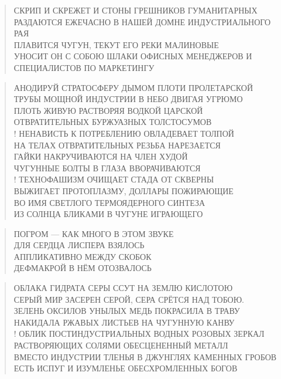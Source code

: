 \poemtitle{***}
\begin{verse}
СКРИП И СКРЕЖЕТ И СТОНЫ ГРЕШНИКОВ ГУМАНИТАРНЫХ\\
РАЗДАЮТСЯ ЕЖЕЧАСНО В НАШЕЙ ДОМНЕ ИНДУСТРИАЛЬНОГО РАЯ\\
ПЛАВИТСЯ ЧУГУН, ТЕКУТ ЕГО РЕКИ МАЛИНОВЫЕ\\
УНОСИТ ОН С СОБОЮ ШЛАКИ ОФИСНЫХ МЕНЕДЖЕРОВ И СПЕЦИАЛИСТОВ ПО МАРКЕТИНГУ
\end{verse}

\poemtitle{***}
\begin{verse}
АНОДИРУЙ СТРАТОСФЕРУ ДЫМОМ ПЛОТИ ПРОЛЕТАРСКОЙ\\
ТРУБЫ МОЩНОЙ ИНДУСТРИИ В НЕБО ДВИГАЯ УГРЮМО\\
ПЛОТЬ ЖИВУЮ РАСТВОРЯЯ ВОДКОЙ ЦАРСКОЙ\\
ОТВРАТИТЕЛЬНЫХ БУРЖУАЗНЫХ ТОЛСТОСУМОВ\\!
НЕНАВИСТЬ К ПОТРЕБЛЕНИЮ ОВЛАДЕВАЕТ ТОЛПОЙ\\
НА ТЕЛАХ ОТВРАТИТЕЛЬНЫХ РЕЗЬБА НАРЕЗАЕТСЯ\\
ГАЙКИ НАКРУЧИВАЮТСЯ НА ЧЛЕН ХУДОЙ\\
ЧУГУННЫЕ БОЛТЫ В ГЛАЗА ВВОРАЧИВАЮТСЯ\\!
ТЕХНОФАШИЗМ ОЧИЩАЕТ СТАДА ОТ СКВЕРНЫ\\
ВЫЖИГАЕТ ПРОТОПЛАЗМУ, ДОЛЛАРЫ ПОЖИРАЮЩИЕ\\
ВО ИМЯ СВЕТЛОГО ТЕРМОЯДЕРНОГО СИНТЕЗА\\
ИЗ СОЛНЦА БЛИКАМИ В ЧУГУНЕ ИГРАЮЩЕГО
\end{verse}

\poemtitle{***}
\begin{verse}
ПОГРОМ --- КАК МНОГО В ЭТОМ ЗВУКЕ\\
ДЛЯ СЕРДЦА ЛИСПЕРА ВЗЯЛОСЬ\\
АППЛИКАТИВНО МЕЖДУ СКОБОК\\
ДЕФМАКРОЙ В НЁМ ОТОЗВАЛОСЬ
\end{verse}

\poemtitle{***}
\begin{verse}
ОБЛАКА ГИДРАТА СЕРЫ ССУТ НА ЗЕМЛЮ КИСЛОТОЮ\\
СЕРЫЙ МИР ЗАСЕРЕН СЕРОЙ, СЕРА СРЁТСЯ НАД ТОБОЮ.\\
ЗЕЛЕНЬ ОКСИЛОВ УНЫЛЫХ МЕДЬ ПОКРАСИЛА В ТРАВУ\\
НАКИДАЛА РЖАВЫХ ЛИСТЬЕВ НА ЧУГУННУЮ КАНВУ\\!
ОБЛИК ПОСТИНДУСТРИАЛЬНЫХ ВОДНЫХ РОЗОВЫХ ЗЕРКАЛ\\
РАСТВОРЯЮЩИХ СОЛЯМИ ОБЕСЦЕНЕННЫЙ МЕТАЛЛ\\
ВМЕСТО ИНДУСТРИИ ТЛЕНЬЯ В ДЖУНГЛЯХ КАМЕННЫХ ГРОБОВ\\
ЕСТЬ ИСПУГ И ИЗУМЛЕНЬЕ ОБЕСХРОМЛЕННЫХ БОГОВ
\end{verse}

